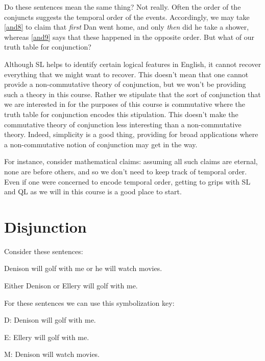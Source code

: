 Do these sentences mean the same thing?
Not really.
Often the order of the conjuncts suggests the temporal order of the events.
Accordingly, we may take \ref{and8} to claim that \textit{first} Dan went home, and only \textit{then} did he take a shower, whereas \ref{and9} says that these happened in the opposite order.
But what of our truth table for conjunction?

Although SL helps to identify certain logical features in English, it cannot recover everything that we might want to recover.
This doesn't mean that one cannot provide a non-commutative theory of conjunction, but we won't be providing such a theory in this course.
Rather we stipulate that the sort of conjunction that we are interested in for the purposes of this course is commutative where the truth table for conjunction encodes this stipulation.
This doesn't make the commutative theory of conjunction less interesting than a non-commutative theory.
Indeed, simplicity is a good thing, providing for broad applications where a non-commutative notion of conjunction may get in the way.

For instance, consider mathematical claims: assuming all such claims are eternal, none are before others, and so we don't need to keep track of temporal order.
Even if one were concerned to encode temporal order, getting to grips with SL and QL as we will in this course is a good place to start.







\section{Disjunction}

Consider these sentences:

\begin{earg}
\item[\ex{or1}]Denison will golf with me or he will watch movies.
\item[\ex{or2}]Either Denison or Ellery will golf with me. 
\end{earg}

For these sentences we can use this symbolization key:

\begin{ekey}
\item[D:] Denison will golf with me.
\item[E:] Ellery will golf with me.
\item[M:] Denison will watch movies.
\end{ekey}

